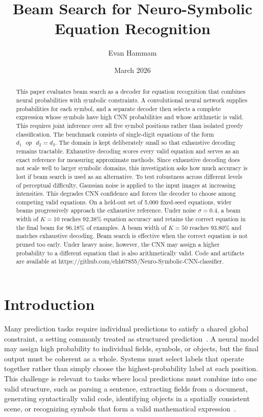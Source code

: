 \documentclass[12pt]{article}
\title{Beam Search for Neuro-Symbolic Equation Recognition}
\author{Evan Hammam}
\date{March 2026}
\begin{document}
\doublespacing

\maketitle

\begin{abstract}
This paper evaluates beam search as a decoder for equation recognition that combines neural probabilities with symbolic constraints. A convolutional neural network supplies probabilities for each symbol, and a separate decoder then selects a complete expression whose symbols have high CNN probabilities and whose arithmetic is valid. This requires joint inference over all five symbol positions rather than isolated greedy classification. The benchmark consists of single-digit equations of the form $d_1 \text{ } op \text{ } d_2 = d_3$. The domain is kept deliberately small so that exhaustive decoding remains tractable. Exhaustive decoding scores every valid equation and serves as an exact reference for measuring approximate methods. Since exhaustive decoding does not scale well to larger symbolic domains, this investigation asks how much accuracy is lost if beam search is used as an alternative. To test robustness across different levels of perceptual difficulty, Gaussian noise is applied to the input images at increasing intensities. This degrades CNN confidence and forces the decoder to choose among competing valid equations. On a held-out set of 5{,}000 fixed-seed equations, wider beams progressively approach the exhaustive reference. Under noise $\sigma=0.4$, a beam width of $K=10$ reaches 92.38\% equation accuracy and retains the correct equation in the final beam for 96.18\% of examples. A beam width of $K=50$ reaches 93.80\% and matches exhaustive decoding. Beam search is effective when the correct equation is not pruned too early. Under heavy noise, however, the CNN may assign a higher probability to a different equation that is also arithmetically valid. Code and artifacts are available at https://github.com/ehh67855/\allowbreak{}Neuro-Symbolic-CNN-\allowbreak{}classifier.

\end{abstract}

\section{Introduction}
Many prediction tasks require individual predictions to satisfy a shared global constraint, a setting commonly treated as structured prediction~\cite{bakir2007,lafferty2001,tsochantaridis2005}. A neural model may assign high probability to individual fields, symbols, or objects, but the final output must be coherent as a whole. Systems must select labels that operate together rather than simply choose the highest-probability label at each position. This challenge is relevant to tasks where local predictions must combine into one valid structure, such as parsing a sentence, extracting fields from a document, generating syntactically valid code, identifying objects in a spatially consistent scene, or recognizing symbols that form a valid mathematical expression~\cite{collins2004,peng2006,gulwani2017,mao2019,zanibbi2012}.
\end{document}
